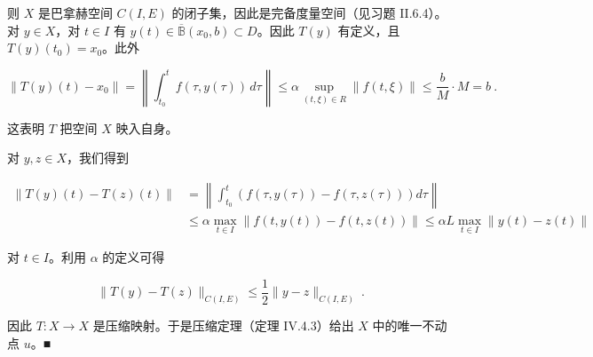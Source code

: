 \begin{theorem}
\begin{subitems}
则 $ X $ 是巴拿赫空间 $ C(I,E) $ 的闭子集，因此是完备度量空间（见习题 II.6.4）。
对 $ y\in X $，对 $ t\in I $ 有 $ y(t)\in\overline{\mathbb{B}}(x_{0},b)\subset D $。因此 $ T(y) $ 有定义，且 $ T(y)(t_{0})=x_{0} $。此外

\[
\|T(y)(t)-x_{0}\|=\left\|\int_{t_{0}}^{t}f(\tau,y(\tau))\,d\tau\right\|\le\alpha\sup_{(t,\xi)\in R}\|f(t,\xi)\|\le\frac{b}{M}\cdot M=b \ .
\]

这表明 $ T $ 把空间 $ X $ 映入自身。

\item

对 $ y,z\in X $，我们得到

\begin{equation*}
\begin{aligned}
\|T(y)(t)-T(z)(t)\|&=\left\|\int_{t_{0}}^{t}\left(f(\tau,y(\tau))-f(\tau,z(\tau))\right)d\tau\right\|\\ &\le\alpha\max_{t\in I}\|f(t,y(t))-f(t,z(t))\|\le\alpha L\max_{t\in I}\|y(t)-z(t)\|
\end{aligned}
\end{equation*}

对 $ t\in I $。利用 $ \alpha $ 的定义可得

\[
\|T(y)-T(z)\|_{C(I,E)}\le\frac{1}{2}\|y-z\|_{C(I,E)} \ .
\]

因此 $ T:X\to X $ 是压缩映射。于是压缩定理（定理 IV.4.3）给出 $ X $ 中的唯一不动点 $ u $。\nobreak\hspace{0.35em}■

\end{subitems}

\end{theorem}

